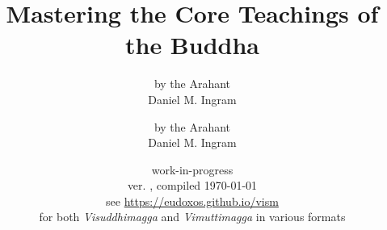 

\ifplastex\else
	\usepackage{newunicodechar}
	\usepackage[weather]{ifsym}
\fi

\def\vismAssertFootnoteCounter#1{\relax}

	\title{Mastering the Core Teachings of the Buddha}
	\date{work-in-progress \\ ver. \vismCommitHref, compiled \today \\ see \url{https://eudoxos.github.io/vism}  \\ for both \emph{Visuddhimagga} and \emph{Vimuttimagga} in various formats}
	\ifplastex
		\author{by the Arahant \\ Daniel M. Ingram}
	\else
		\author{by the Arahant \\ Daniel M. Ingram}
	\fi
	\maketitle

	\frontmatter
		\renewcommand{\thechapter}{\arabic{chapter}}

		\bgroup
			\ifplastex\else\renewcommand{\baselinestretch}{0.2}\normalsize\fi
			\tableofcontents
		\egroup
		

